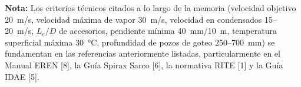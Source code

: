 \vspace{0.5cm}
\noindent\textbf{Nota:} Los criterios técnicos citados a lo largo de la memoria (velocidad objetivo 20~m/s, velocidad máxima de vapor 30~m/s, velocidad en condensados 15--20~m/s, $L_e/D$ de accesorios, pendiente mínima 40~mm/10~m, temperatura superficial máxima 30~°C, profundidad de pozos de goteo 250--700~mm) se fundamentan en las referencias anteriormente listadas, particularmente en el Manual EREN [8], la Guía Spirax Sarco [6], la normativa RITE [1] y la Guía IDAE [5].


